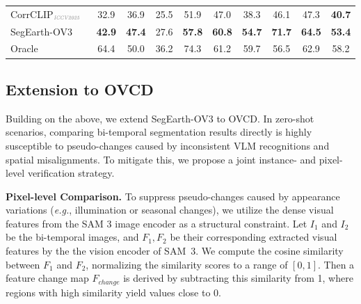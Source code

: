 \documentclass[twocolumn,switch,times]{article}
\newcommand{\samov}{SegEarth-OV\textcolor{cvprpink}{3}\xspace}
\begin{document}
\begin{table}
{\begin{tabular}{@{}lcccccccc|c@{}}
    CorrCLIP$_{\textcolor{gray}{\text{\tiny \textit{ICCV2025}}}}$~\citep{zhang2025corrclip} & 32.9 & 36.9 & 25.5 & 51.9 & 47.0 & 38.3 & 46.1 & 47.3 & \textcolor{tabblue}{\textbf{40.7}} \\
    \samov & \textcolor{tabred}{\textbf{42.9}} & \textcolor{tabred}{\textbf{47.4}} & 27.6 & \textcolor{tabred}{\textbf{57.8}} & \textcolor{tabred}{\textbf{60.8}} & \textcolor{tabred}{\textbf{54.7}} & \textcolor{tabred}{\textbf{71.7}} & \textcolor{tabred}{\textbf{64.5}} & \textcolor{tabred}{\textbf{53.4}} \\
    \midrule
    \textcolor{tablegray}{Oracle} & \textcolor{tablegray}{64.4} & \textcolor{tablegray}{50.0} & \textcolor{tablegray}{36.2} & \textcolor{tablegray}{74.3} & \textcolor{tablegray}{61.2} & \textcolor{tablegray}{59.7} & \textcolor{tablegray}{56.5} & \textcolor{tablegray}{62.9} & \textcolor{tablegray}{58.2} \\
    \bottomrule
  \end{tabular}}
\end{table}

\subsection{Extension to OVCD}

Building on the above, we extend \samov to OVCD. In zero-shot scenarios, comparing bi-temporal segmentation results directly is highly susceptible to pseudo-changes caused by inconsistent VLM recognitions and spatial misalignments. To mitigate this, we propose a joint instance- and pixel-level verification strategy.

\noindent
\textbf{Pixel-level Comparison.}
To suppress pseudo-changes caused by appearance variations (\textit{e.g.}, illumination or seasonal changes), we utilize the dense visual features from the SAM 3 image encoder as a structural constraint. Let $I_1$ and $I_2$ be the bi-temporal images, and $F_1, F_2$ be their corresponding extracted visual features by the the vision encoder of SAM~3. We compute the cosine similarity between $F_1$ and $F_2$, normalizing the similarity scores to a range of $[0, 1]$. Then a feature change map $F_{change}$ is derived by subtracting this similarity from 1, where regions with high similarity yield values close to 0.
\end{document}
